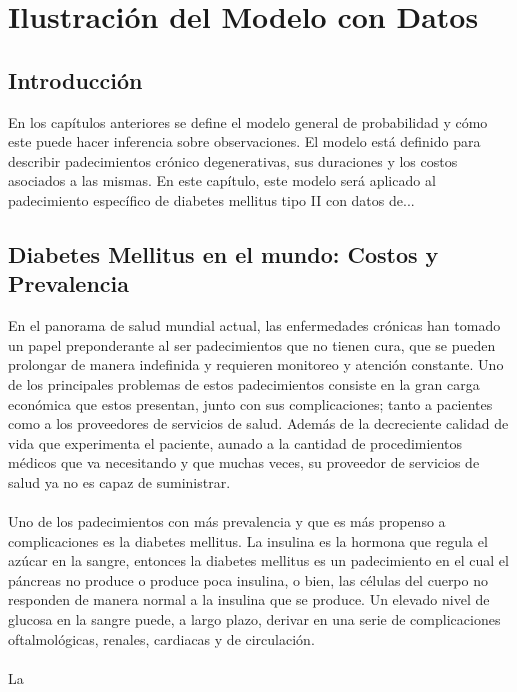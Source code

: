 \chapter{Ilustraci\'on del Modelo con Datos}
\section{Introducci\'on}
En los cap\'itulos anteriores se define el modelo general de probabilidad y c\'omo este puede hacer inferencia sobre observaciones. El modelo est\'a definido para describir padecimientos cr\'onico degenerativas, sus duraciones y los costos asociados a las mismas. En este cap\'itulo, este modelo ser\'a aplicado al padecimiento espec\'ifico de diabetes mellitus tipo II con datos de...\\
\section{Diabetes Mellitus en el mundo: Costos y Prevalencia}
En el panorama de salud mundial actual, las enfermedades cr\'onicas han tomado un papel preponderante al ser padecimientos que no tienen cura, que se pueden prolongar de manera indefinida y requieren monitoreo y atenci\'on constante. Uno de los principales problemas de estos padecimientos consiste en la gran carga econ\'omica que estos presentan, junto con sus complicaciones; tanto a pacientes como a los proveedores de servicios de salud. Adem\'as de la decreciente calidad de vida que experimenta el paciente, aunado a la cantidad de procedimientos m\'edicos que va necesitando y que muchas veces, su proveedor de servicios de salud ya no es capaz de suministrar.\\
\\
Uno de los padecimientos con m\'as prevalencia y que es m\'as propenso a complicaciones es la diabetes mellitus. La insulina es la hormona que regula el az\'ucar en la sangre, entonces la diabetes mellitus es un padecimiento en el cual el p\'ancreas no produce o produce poca insulina, o bien, las c\'elulas del cuerpo no responden de manera normal a la insulina que se produce. Un elevado nivel de glucosa en la sangre puede, a largo plazo, derivar en una serie de complicaciones oftalmol\'ogicas, renales, cardiacas y de circulaci\'on.\\
\\
La \cite{FactSheetDiabetes} %
